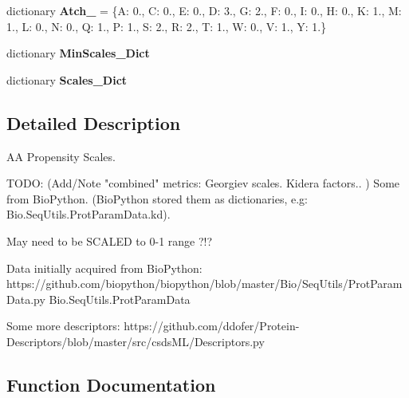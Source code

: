 \begin{DoxyCompactItemize}
\item 
\hypertarget{namespacefeat__extract_1_1_a_a_scales_a99cc13ce48869fcb663d075be7b73856}{}dictionary {\bfseries Atch\+\_} = \{\textquotesingle{}A\textquotesingle{}\+: 0., \textquotesingle{}C\textquotesingle{}\+: 0., \textquotesingle{}E\textquotesingle{}\+: 0., \textquotesingle{}D\textquotesingle{}\+: 3., \textquotesingle{}G\textquotesingle{}\+: 2., \textquotesingle{}F\textquotesingle{}\+: 0., \textquotesingle{}I\textquotesingle{}\+: 0., \textquotesingle{}H\textquotesingle{}\+: 0., \textquotesingle{}K\textquotesingle{}\+: 1., \textquotesingle{}M\textquotesingle{}\+: 1., \textquotesingle{}L\textquotesingle{}\+: 0., \textquotesingle{}N\textquotesingle{}\+: 0., \textquotesingle{}Q\textquotesingle{}\+: 1., \textquotesingle{}P\textquotesingle{}\+: 1., \textquotesingle{}S\textquotesingle{}\+: 2., \textquotesingle{}R\textquotesingle{}\+: 2., \textquotesingle{}T\textquotesingle{}\+: 1., \textquotesingle{}W\textquotesingle{}\+: 0., \textquotesingle{}V\textquotesingle{}\+: 1., \textquotesingle{}Y\textquotesingle{}\+: 1.\}\label{namespacefeat__extract_1_1_a_a_scales_a99cc13ce48869fcb663d075be7b73856}

\item 
dictionary {\bfseries Min\+Scales\+\_\+\+Dict}
\item 
dictionary {\bfseries Scales\+\_\+\+Dict}
\end{DoxyCompactItemize}


\subsection{Detailed Description}
\begin{DoxyVerb}AA Propensity Scales.

TODO: (Add/Note "combined" metrics: Georgiev scales. Kidera factors.. )
Some from BioPython.
(BioPython stored them as dictionaries, e.g: Bio.SeqUtils.ProtParamData.kd).

May need to be SCALED to 0-1 range ?!?

Data initially acquired from BioPython:
https://github.com/biopython/biopython/blob/master/Bio/SeqUtils/ProtParamData.py
Bio.SeqUtils.ProtParamData

Some more descriptors:
https://github.com/ddofer/Protein-Descriptors/blob/master/src/csdsML/Descriptors.py
\end{DoxyVerb}
 

\subsection{Function Documentation}
\hypertarget{namespacefeat__extract_1_1_a_a_scales_a2ae32c594dc8982017080a7934d0be22}{}
